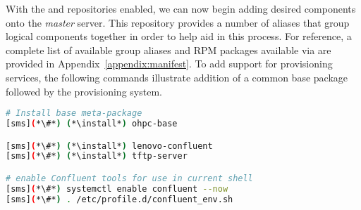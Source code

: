 
With the \OHPC{} and \Confluent{} repositories enabled, we can now begin adding desired components onto the {\em master}
server. This repository provides a number of aliases that group logical components together in order to help aid in this
process. For reference, a complete list of available group aliases and RPM packages available via \OHPC{} are provided
in Appendix~\ref{appendix:manifest}. To add support for provisioning services, the following commands illustrate
addition of a common base package followed by the \Confluent{} provisioning system.

\begin{lstlisting}[language=bash,keywords={}]
# Install base meta-package
[sms](*\#*) (*\install*) ohpc-base

[sms](*\#*) (*\install*) lenovo-confluent
[sms](*\#*) (*\install*) tftp-server

# enable Confluent tools for use in current shell
[sms](*\#*) systemctl enable confluent --now
[sms](*\#*) . /etc/profile.d/confluent_env.sh
\end{lstlisting}
